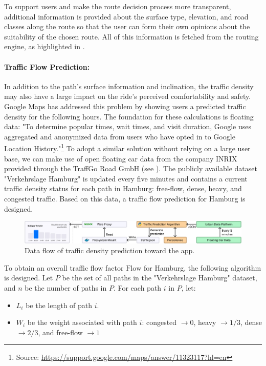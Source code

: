 To support users and make the route decision process more transparent, additional information is provided about the surface type, elevation, and road classes along the route so that the user can form their own opinions about the suitability of the chosen route. All of this information is fetched from the routing engine, as highlighted in .

\paragraph{Traffic Flow Prediction:} In addition to the path's surface information and inclination, the traffic density may also have a large impact on the ride's perceived comfortability and safety. Google Maps has addressed this problem by showing users a predicted traffic density for the following hours. The foundation for these calculations is floating data: "To determine popular times, wait times, and visit duration, Google uses aggregated and anonymized data from users who have opted in to Google Location History."\footnote{Source: \url{https://support.google.com/maps/answer/11323117?hl=en}} To adopt a similar solution without relying on a large user base, we can make use of open floating car data from the company INRIX provided through the TraffGo Road GmbH (see ). The publicly available dataset "Verkehrslage Hamburg" is updated every five minutes and contains a current traffic density status for each path in Hamburg: free-flow, dense, heavy, and congested traffic. Based on this data, a traffic flow prediction for Hamburg is designed.

\begin{figure}[htbp]
\centering
\includegraphics[width=\linewidth]{images/traffic-density-prediction.pdf}
\caption{Data flow of traffic density prediction toward the app.}
\label{fig:traffic-density-prediction}
\end{figure}

To obtain an overall traffic flow factor $\text{Flow}$ for Hamburg, the following algorithm is designed. Let $P$ be the set of all paths in the "Verkehrslage Hamburg" dataset, and $n$ be the number of paths in $P$. For each path $i$ in $P$, let:

\begin{itemize}
    \item $L_i$ be the length of path $i$.
    \item $W_i$ be the weight associated with path $i$: congested $\rightarrow 0$, heavy $\rightarrow 1/3$, dense $\rightarrow 2/3$, and free-flow $\rightarrow 1$
\end{itemize}

